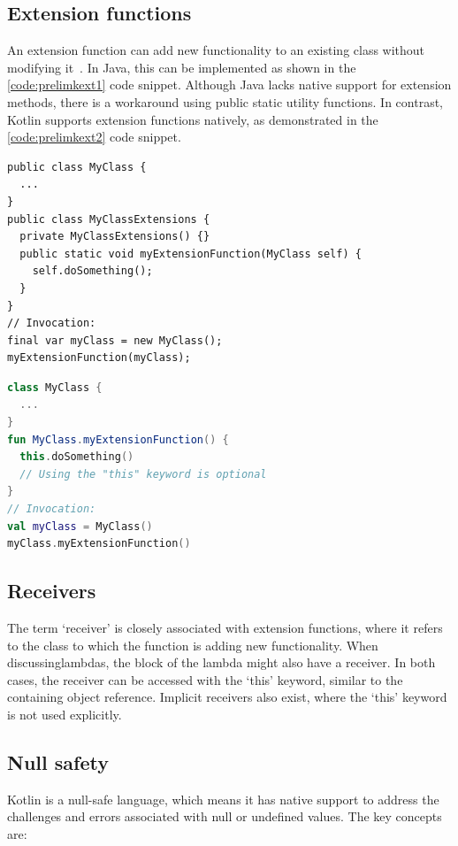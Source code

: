 \subsection{Extension functions}
\label{sec:extension}

An extension function can add new functionality to an existing class without modifying it~\cite{KExt}. In Java, this can be implemented as shown in the \ref{code:prelimkext1} code snippet. Although Java lacks native support for extension methods, there is a workaround using public static utility functions. In contrast, Kotlin supports extension functions natively, as demonstrated in the \ref{code:prelimkext2} code snippet.

\begin{lstlisting}[caption={Extension functions in Java},language=Java11,label=code:prelimkext1]
public class MyClass {
  ...
}
public class MyClassExtensions {
  private MyClassExtensions() {}
  public static void myExtensionFunction(MyClass self) {
    self.doSomething();
  }
}
// Invocation:
final var myClass = new MyClass();
myExtensionFunction(myClass);
\end{lstlisting}

\begin{lstlisting}[caption={Extension functions in Kotlin},language=Kotlin,label=code:prelimkext2]
class MyClass {
  ...
}
fun MyClass.myExtensionFunction() {
  this.doSomething()
  // Using the "this" keyword is optional
}
// Invocation:
val myClass = MyClass()
myClass.myExtensionFunction()
\end{lstlisting}

\subsection{Receivers}

The term `receiver' is closely associated with extension functions, where it refers to the class to which the function is adding new functionality. When discussinglambdas, the block of the lambda might also have a receiver. In both cases, the receiver can be accessed with the `this' keyword, similar to the containing object reference. Implicit receivers also exist, where the `this' keyword is not used explicitly.

\subsection{Null safety}

Kotlin is a null-safe language, which means it has native support to address the challenges and errors associated with null or undefined values. The key concepts are:

